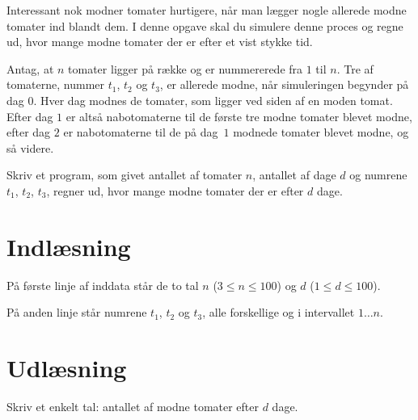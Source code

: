 
Interessant nok modner tomater hurtigere, når man lægger nogle allerede modne tomater ind blandt dem.
I denne opgave skal du simulere denne proces og regne ud, hvor mange modne tomater der er efter et vist stykke tid.

Antag, at $n$ tomater ligger på række og er nummererede fra $1$ til $n$.
Tre af tomaterne, nummer $t_1$, $t_2$ og $t_3$, er allerede modne, når simuleringen begynder på dag $0$.
Hver dag modnes de tomater, som ligger ved siden af en moden tomat.
Efter dag $1$ er altså nabotomaterne til de første tre modne tomater blevet modne, efter dag $2$ er nabotomaterne til de på dag~$1$ modnede tomater blevet modne, og så videre.

Skriv et program, som givet antallet af tomater $n$, antallet af dage $d$ og numrene $t_1$, $t_2$, $t_3$, regner ud, hvor mange modne tomater der er efter $d$ dage.

\section*{Indlæsning}

På første linje af inddata står de to tal $n$ ($3 \le n \le 100$) og $d$ ($1 \le d \le 100$).

På anden linje står numrene $t_1$, $t_2$ og $t_3$, alle forskellige og i intervallet $1 \dots n$.

\section*{Udlæsning}
Skriv et enkelt tal: antallet af modne tomater efter $d$ dage.
